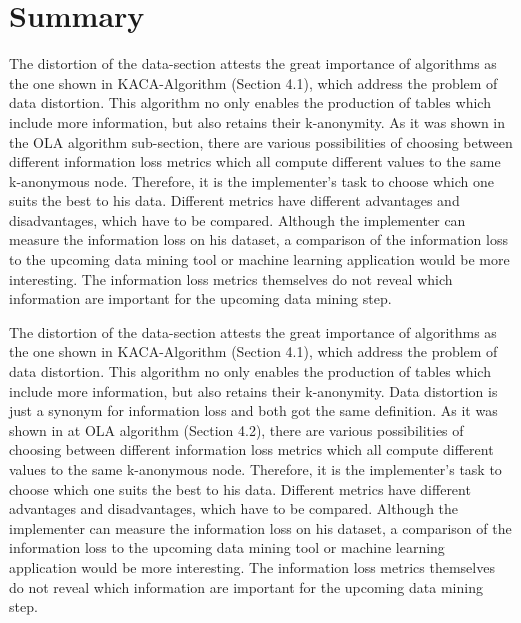 \documentclass{llncs}
\begin{document}
\section{Summary}
The distortion of the data-section attests the great importance of algorithms as  the one shown in KACA-Algorithm (Section 4.1), which address the problem of data distortion. This algorithm no only enables the production of tables which include more information, but also retains their k-anonymity. As it was shown in the OLA algorithm sub-section, there are various possibilities of choosing between different information loss metrics which all compute different values to the same k-anonymous node. Therefore, it is the implementer’s task to choose which one suits the best to his data. Different metrics have different advantages and disadvantages, which have to be compared. Although the implementer can measure the information loss on his dataset, a comparison of the information loss to the upcoming data mining tool or machine learning application would be more interesting. The information loss metrics themselves do not reveal which information are important for the upcoming data mining step. 

The distortion of the data-section attests the great importance of algorithms as  the one shown in KACA-Algorithm (Section 4.1), which address the problem of data distortion. This algorithm no only enables the production of tables which include more information, but also retains their k-anonymity.  Data distortion is just a synonym for information loss and both got the same definition.
As it was shown in at OLA algorithm (Section 4.2), there are various possibilities of choosing between different information loss metrics which all compute different values to the same k-anonymous node. Therefore, it is the implementer’s task to choose which one suits the best to his data. Different metrics have different advantages and disadvantages, which have to be compared\cite{el2009globally}. Although the implementer can measure the information loss on his dataset, a comparison of the information loss to the upcoming data mining tool or machine learning application would be more interesting. The information loss metrics themselves do not reveal which information are important for the upcoming data mining step. 
\end{document}
